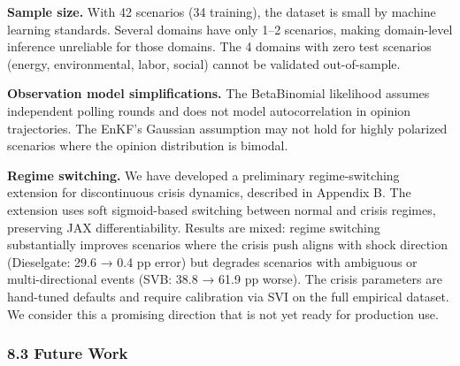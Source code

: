 \documentclass[
]{article}
\begin{document}
\textbf{Sample size.} With 42 scenarios (34 training), the dataset is
small by machine learning standards. Several domains have only 1--2
scenarios, making domain-level inference unreliable for those domains.
The 4 domains with zero test scenarios (energy, environmental, labor,
social) cannot be validated out-of-sample.

\textbf{Observation model simplifications.} The BetaBinomial likelihood
assumes independent polling rounds and does not model autocorrelation in
opinion trajectories. The EnKF's Gaussian assumption may not hold for
highly polarized scenarios where the opinion distribution is bimodal.

\textbf{Regime switching.} We have developed a preliminary
regime-switching extension for discontinuous crisis dynamics, described
in Appendix B. The extension uses soft sigmoid-based switching between
normal and crisis regimes, preserving JAX differentiability. Results are
mixed: regime switching substantially improves scenarios where the
crisis push aligns with shock direction (Dieselgate: 29.6 → 0.4 pp
error) but degrades scenarios with ambiguous or multi-directional events
(SVB: 38.8 → 61.9 pp worse). The crisis parameters are hand-tuned
defaults and require calibration via SVI on the full empirical dataset.
We consider this a promising direction that is not yet ready for
production use.

\subsubsection{8.3 Future Work}\label{future-work}
\end{document}
